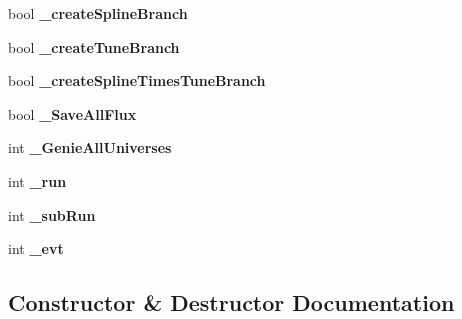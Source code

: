 \begin{DoxyCompactItemize}
\item 
bool {\bfseries \+\_\+create\+Spline\+Branch}\hypertarget{classanalysis_1_1EventWeightTree_a20a763fab2d058c9742b9101e90da819}{}\label{classanalysis_1_1EventWeightTree_a20a763fab2d058c9742b9101e90da819}

\item 
bool {\bfseries \+\_\+create\+Tune\+Branch}\hypertarget{classanalysis_1_1EventWeightTree_a2dff4fab4d8dc3475baec548d1ddfa94}{}\label{classanalysis_1_1EventWeightTree_a2dff4fab4d8dc3475baec548d1ddfa94}

\item 
bool {\bfseries \+\_\+create\+Spline\+Times\+Tune\+Branch}\hypertarget{classanalysis_1_1EventWeightTree_a024f8c6e40c73b50d7a08c9cdb1332a0}{}\label{classanalysis_1_1EventWeightTree_a024f8c6e40c73b50d7a08c9cdb1332a0}

\item 
bool {\bfseries \+\_\+\+Save\+All\+Flux}\hypertarget{classanalysis_1_1EventWeightTree_a440c167a5f7794ffa4bf32a690bc6565}{}\label{classanalysis_1_1EventWeightTree_a440c167a5f7794ffa4bf32a690bc6565}

\item 
int {\bfseries \+\_\+\+Genie\+All\+Universes}\hypertarget{classanalysis_1_1EventWeightTree_a44f5add7cf7f9032767885a53454571c}{}\label{classanalysis_1_1EventWeightTree_a44f5add7cf7f9032767885a53454571c}

\item 
int {\bfseries \+\_\+run}\hypertarget{classanalysis_1_1EventWeightTree_ac52e040d9ffac87eeeb4222fe175338b}{}\label{classanalysis_1_1EventWeightTree_ac52e040d9ffac87eeeb4222fe175338b}

\item 
int {\bfseries \+\_\+sub\+Run}\hypertarget{classanalysis_1_1EventWeightTree_a6d993a5f48707b15251e6c615f83be14}{}\label{classanalysis_1_1EventWeightTree_a6d993a5f48707b15251e6c615f83be14}

\item 
int {\bfseries \+\_\+evt}\hypertarget{classanalysis_1_1EventWeightTree_aea12ca02fb94fe73ae1da0ef9f8682aa}{}\label{classanalysis_1_1EventWeightTree_aea12ca02fb94fe73ae1da0ef9f8682aa}

\end{DoxyCompactItemize}


\subsection{Constructor \& Destructor Documentation}

